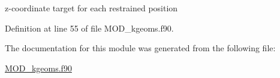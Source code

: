 z-\/coordinate target for each restrained position 



Definition at line 55 of file M\-O\-D\-\_\-kgeoms.\-f90.



The documentation for this module was generated from the following file\-:\begin{DoxyCompactItemize}
\item 
\hyperlink{MOD__kgeoms_8f90}{M\-O\-D\-\_\-kgeoms.\-f90}\end{DoxyCompactItemize}
